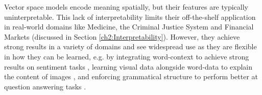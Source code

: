 


%





Vector space models encode meaning spatially, but their features are typically uninterpretable. This lack of interpretability limits their off-the-shelf application in real-world domains like Medicine, the Criminal Justice System and Financial Markets (discussed in Section \ref{ch2:Interpretability}). However, they achieve strong results in a variety of domains and see widespread use as they  are flexible in how they can be learned, e.g. by integrating word-context  to achieve strong results on sentiment tasks \cite{Pennington2014}, learning visual data alongside word-data to explain the content of images \cite{Mao2014a}, and enforcing grammatical structure to perform better at question answering tasks \cite{Palangi2017}. 

